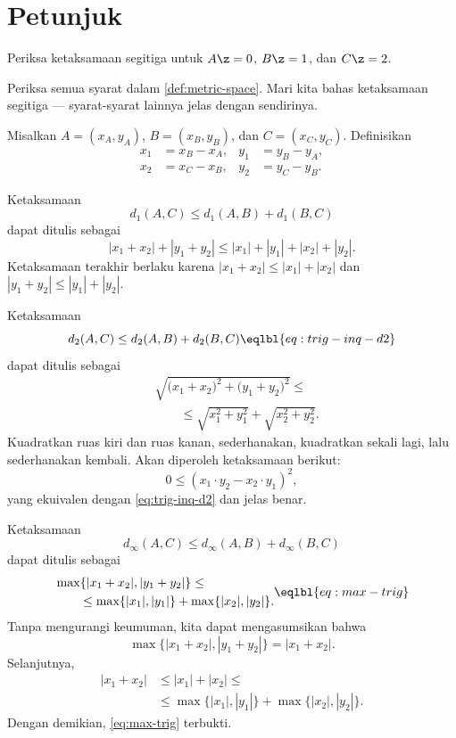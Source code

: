 \backmatter


\chapter[Petunjuk]{\vspace*{-20mm}Petunjuk\vspace*{-10mm}}
\setcounter{eqtn}{0}

 Periksa ketaksamaan segitiga untuk $A\z=0$, $B\z=1$, dan $C\z=2$.

Periksa semua syarat dalam \ref{def:metric-space}.
Mari kita bahas ketaksamaan segitiga --- syarat-syarat lainnya jelas dengan sendirinya.

Misalkan $A=(x_A,y_A)$, $B=(x_B,y_B)$, dan $C=(x_C,y_C)$.
Definisikan 
\begin{align*}
x_1&=x_B-x_A, 
&
y_1&=y_B-y_A,
\\
x_2&=x_C-x_B,
&
y_2&=y_C-y_B.
\end{align*}

Ketaksamaan
$$d_1(A,C)\le d_1(A,B)+d_1(B,C)$$
dapat ditulis sebagai 
$$|x_1+x_2|+|y_1+y_2|
\le 
|x_1|+|y_1|+|x_2|+|y_2|.$$
Ketaksamaan terakhir berlaku karena $|x_1+x_2|\le |x_1|+|x_2|$ 
dan
$|y_1+y_2|\le |y_1|+|y_2|$.

Ketaksamaan
$$d_2(A,C)\le d_2(A,B)+d_2(B,C)\eqlbl{eq:trig-inq-d2}$$
dapat ditulis sebagai 
\begin{align*}
&\sqrt{\bigl(x_1+x_2\bigr)^2+\bigl(y_1+y_2\bigr)^2}\le
\\
&\qquad\le
\sqrt{x_1^2+y_1^2}+\sqrt{x_2^2+y_2^2}.
\end{align*}
Kuadratkan ruas kiri dan ruas kanan,
sederhanakan,
kuadratkan sekali lagi, lalu sederhanakan kembali.
Akan diperoleh ketaksamaan berikut:
$$0
\le 
(x_1\cdot y_2-x_2\cdot y_1)^2,$$
yang ekuivalen dengan \ref{eq:trig-inq-d2}
dan jelas benar.

Ketaksamaan
$$d_\infty(A,C)\le d_\infty(A,B)+d_\infty(B,C)$$
dapat ditulis sebagai 
$$
\begin{aligned}
&\max\{|x_1+x_2|,|y_1+y_2|\}\le
\\
&\qquad\le 
\max\{|x_1|,|y_1|\}+\max\{|x_2|,|y_2|\}.
\end{aligned}
\eqlbl{eq:max-trig}$$
Tanpa mengurangi keumuman, kita dapat mengasumsikan bahwa 
$$\max\{|x_1+x_2|,|y_1+y_2|\}=|x_1+x_2|.$$
Selanjutnya,
\columnbreak
\begin{align*}
|x_1+x_2|&\le |x_1|+|x_2|\le 
\\
&\le\max\{|x_1|,|y_1|\}+\max\{|x_2|,|y_2|\}.
\end{align*}
Dengan demikian, \ref{eq:max-trig} terbukti.

